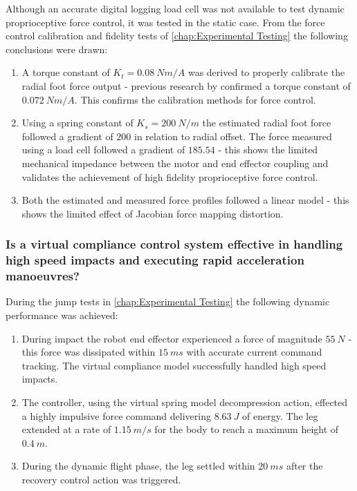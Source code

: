 Although an accurate digital logging load cell was not available to test dynamic proprioceptive force control, it was tested in the static case. From the force control calibration and fidelity tests of \cref{chap:Experimental Testing} the following conclusions were drawn:

\begin{enumerate}
\item A torque constant of $K_t = 0.08\ Nm/A$ was derived to properly calibrate the radial foot force output - previous research by \cite{Kalouche2016} confirmed a torque constant of $0.072\ Nm/A$. This confirms the calibration methods for force control.
\item Using a spring constant of $K_s = 200\ N/m$ the estimated radial foot force followed a gradient of $200$ in relation to radial offset. The force measured using a load cell followed a gradient of $185.54$ - this shows the limited mechanical impedance between the motor and end effector coupling and validates the achievement of high fidelity proprioceptive force control.
\item Both the estimated and measured force profiles followed a linear model - this shows the limited effect of Jacobian force mapping distortion.
\end{enumerate}

\subsubsection*{Is a virtual compliance control system effective in handling high speed impacts and executing rapid acceleration manoeuvres?}

During the jump tests in \cref{chap:Experimental Testing} the following dynamic performance was achieved:

\begin{enumerate}
\item During impact the robot end effector experienced a force of magnitude $55\ N$ - this force was dissipated within $15\ ms$ with accurate current command tracking. The virtual compliance model successfully handled high speed impacts.
\item The controller, using the virtual spring model decompression action, effected a highly impulsive force command delivering $8.63\ J$ of energy. The leg extended at a rate  of $1.15\ m/s$ for the body to reach a maximum height of $0.4\ m$.
\item During the dynamic flight phase, the leg settled within $20\ ms$ after the recovery control action was triggered.
\end{enumerate}

